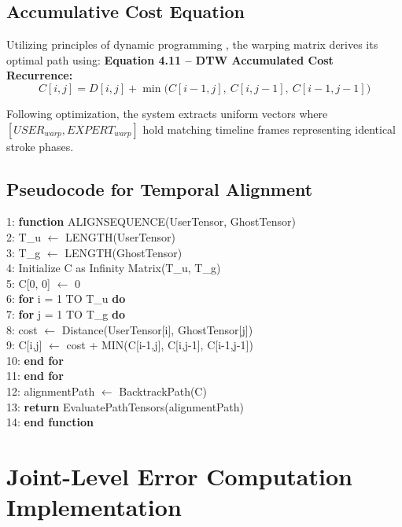 \begin{sloppypar}
\subsection{Accumulative Cost Equation}
Utilizing principles of dynamic programming \cite{dtw_sakoe}, the warping matrix derives its optimal path using:
\textbf{Equation 4.11 -- DTW Accumulated Cost Recurrence:}
\begin{equation}
C[i, j] = D[i, j] + \min\big(C[i-1, j],\ C[i, j-1],\ C[i-1, j-1]\big)
\tag{4.11}
\end{equation}

Following optimization, the system extracts uniform vectors where $[USER_{warp}, EXPERT_{warp}]$ hold matching timeline frames representing identical stroke phases.

\subsection{Pseudocode for Temporal Alignment}

1: \textbf{function} ALIGNSEQUENCE(UserTensor, GhostTensor)\\
2: \quad T\_u $\leftarrow$ LENGTH(UserTensor)\\
3: \quad T\_g $\leftarrow$ LENGTH(GhostTensor)\\
4: \quad Initialize C as Infinity Matrix(T\_u, T\_g)\\
5: \quad C[0, 0] $\leftarrow$ 0\\
6: \quad \textbf{for} i = 1 TO T\_u \textbf{do}\\
7: \qquad \textbf{for} j = 1 TO T\_g \textbf{do}\\
8: \qquad\quad cost $\leftarrow$ Distance(UserTensor[i], GhostTensor[j])\\
9: \qquad\quad C[i,j] $\leftarrow$ cost + MIN(C[i-1,j], C[i,j-1], C[i-1,j-1])\\
10: \qquad \textbf{end for}\\
11: \quad \textbf{end for}\\
12: \quad alignmentPath $\leftarrow$ BacktrackPath(C)\\
13: \quad \textbf{return} EvaluatePathTensors(alignmentPath)\\
14: \textbf{end function}
\algofooter


\section{Joint-Level Error Computation Implementation}


\end{sloppypar}
